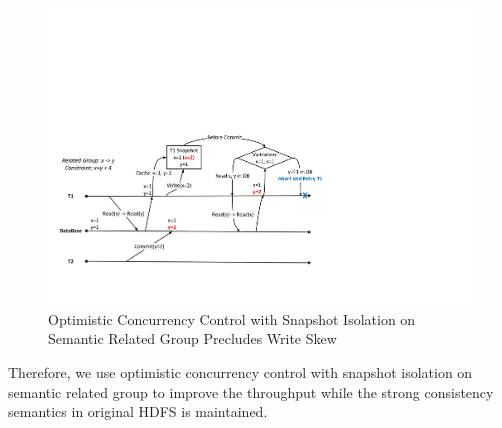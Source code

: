 \begin{figure}[h]
	\centering
	\includegraphics[width=\linewidth]{figs/snapwriteskew.pdf}
	\caption{Optimistic Concurrency Control with Snapshot Isolation on Semantic Related Group Precludes Write Skew}
	\label{fig:snapwriteskew}
\end{figure}

\noindent Therefore, we use optimistic concurrency control with snapshot isolation on semantic related group to improve the throughput while the strong consistency semantics in original HDFS is maintained.